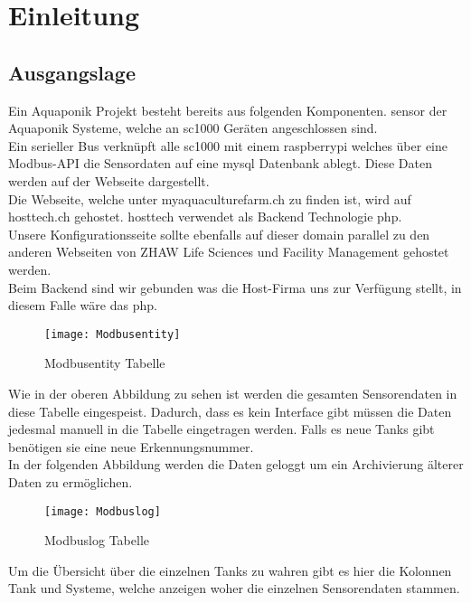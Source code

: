 \documentclass[../main.tex]{subfiles}
\begin{document}
	
	
	\section{Einleitung}
	
	\subsection{Ausgangslage}
	Ein Aquaponik Projekt besteht bereits aus folgenden Komponenten. \gls{sensor} der Aquaponik Systeme, welche an \gls{sc1000} Geräten angeschlossen sind. \\
	Ein serieller Bus verknüpft alle \gls{sc1000} mit einem \gls{raspberrypi} welches über eine Modbus-API die Sensordaten auf eine \gls{mysql} Datenbank ablegt. Diese Daten werden auf der Webseite dargestellt. \\
	Die Webseite, welche unter myaquaculturefarm.ch zu finden ist, wird auf hosttech.ch gehostet. \gls{hosttech} verwendet als Backend Technologie \gls{php}.\\
	Unsere Konfigurationsseite sollte ebenfalls auf dieser \gls{domain} parallel zu den anderen Webseiten von ZHAW Life Sciences und Facility Management gehostet werden. \\
	Beim Backend sind wir gebunden was die Host-Firma uns zur Verfügung stellt, in diesem Falle wäre das \gls{php}.
	
	\begin{figure}[H]
		\centering
		\texttt{[image: Modbusentity]}
		\caption{Modbusentity Tabelle}
		\label{fig:Modbusentity}
	\end{figure}
	\par \noindent
	Wie in der oberen Abbildung zu sehen ist werden die gesamten Sensorendaten in diese Tabelle eingespeist. Dadurch, dass es kein Interface gibt müssen die Daten jedesmal manuell in die Tabelle eingetragen werden. Falls es neue Tanks gibt benötigen sie eine neue Erkennungsnummer.  \\
	In der folgenden Abbildung werden die Daten geloggt um ein Archivierung älterer Daten zu ermöglichen.
	
	\begin{figure}[H]
		\centering
		\texttt{[image: Modbuslog]}
		\caption{Modbuslog Tabelle}
		\label{fig:Modbuslog}
	\end{figure}
	\par \noindent	
	Um die Übersicht über die einzelnen Tanks zu wahren gibt es hier die Kolonnen Tank und Systeme, welche anzeigen woher die einzelnen Sensorendaten stammen.
	
\end{document}
